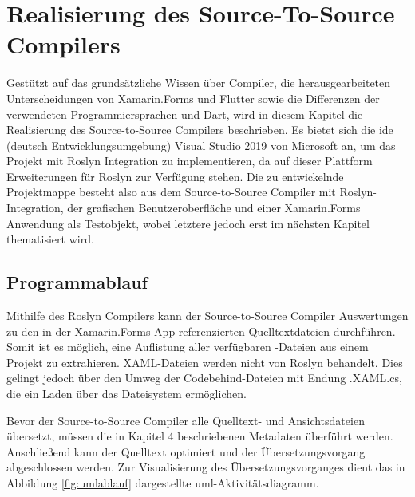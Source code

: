 \chapter{Realisierung des Source-To-Source Compilers}
\label{chap:Realisierung}
Gestützt auf das grundsätzliche Wissen über Compiler, die herausgearbeiteten Unterscheidungen von  Xamarin.Forms und Flutter sowie die Differenzen der verwendeten Programmiersprachen  \Csharp{} und Dart, wird in diesem Kapitel die Realisierung des Source-to-Source Compilers beschrieben.  Es bietet sich die \ac{ide} (deutsch Entwicklungsumgebung) Visual Studio 2019 von Microsoft an,  um das Projekt mit Roslyn Integration zu implementieren,  da auf dieser Plattform Erweiterungen für Roslyn zur Verfügung stehen.
Die zu entwickelnde Projektmappe besteht also aus dem Source-to-Source Compiler mit Roslyn-Integration, der grafischen Benutzeroberfläche und einer Xamarin.Forms Anwendung als Testobjekt,  wobei letztere jedoch erst im nächsten Kapitel thematisiert wird.


\section{Programmablauf}
Mithilfe des Roslyn Compilers kann der Source-to-Source Compiler Auswertungen zu den in der Xamarin.Forms App referenzierten Quelltextdateien durchführen.  Somit ist es möglich,  eine Auflistung aller verfügbaren \Csharp-Dateien aus einem Projekt zu extrahieren.  XAML-Dateien werden nicht von Roslyn behandelt.  Dies gelingt jedoch über den Umweg der Codebehind-Dateien mit Endung .XAML.cs,  die ein Laden über das Dateisystem ermöglichen. 

Bevor der Source-to-Source Compiler alle Quelltext- und Ansichtsdateien übersetzt,  müssen die in Kapitel 4 beschriebenen Metadaten überführt werden.  Anschließend kann der Quelltext optimiert und der Übersetzungsvorgang abgeschlossen werden.  Zur Visualisierung des Übersetzungsvorganges dient das in Abbildung \ref{fig:umlablauf} dargestellte \ac{uml}-Aktivitätsdiagramm.

